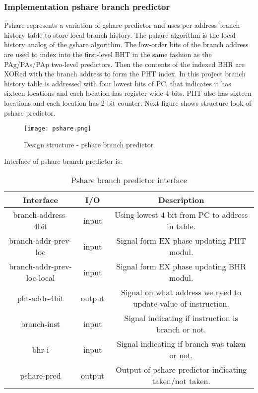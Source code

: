 \documentclass{scrreprt}
\begin{document}
\subsubsection*{Implementation pshare branch predictor}
Pshare represents a variation of gshare predictor and uses per-address branch history table to store local branch history. The pshare algorithm is the local-history analog of the gshare algorithm. The low-order bits of the branch address are used to index into the first-level BHT in the same fashion as the PAg/PAs/PAp two-level predictors. Then the contents of the indexed BHR are XORed with the branch address to form the PHT index.
In this project branch history table is addressed with four lowest bits of PC, that indicates it has sixteen locations and each location has register wide 4 bits. PHT also has sixteen locations and each location has 2-bit counter. Next figure shows structure look of pshare predictor. 
\begin{figure}[htb!]
    \centering
    \texttt{[image: pshare.png]}
    \caption{Design structure - pshare branch predictor}
    \label{fig:pshare}
\end{figure}
\newline
\newline
\newline
\newline
\newline
\newline
\newline
Interface of pshare branch predictor is:
        \begin{table}[htb!]
            \centering
            \begin{tabular}{|c|c|c|} \hline 
             Interface & I/O & Description \\ \hline  
             branch-address-4bit & input & Using lowest 4 bit from PC to address in table. \\ \hline
             branch-addr-prev-loc & input & Signal form EX phase updating PHT modul.  \\ \hline
             branch-addr-prev-loc-local & input & Signal form EX phase updating BHR modul.  \\ \hline
             pht-addr-4bit & output & Signal on what address we need to update value of instruction.  \\ 
             \hline
             branch-inst & input & Signal indicating if instruction is branch or not.  \\ \hline
             bhr-i & input & Signal indicating if branch was taken or not.  \\ \hline
             pshare-pred & output & Output of pshare predictor indicating taken/not taken.  \\ \hline
        \end{tabular}
        \caption{Pshare branch predictor interface}
        \label{tab:pshareI}
    \end{table}
\end{document}
